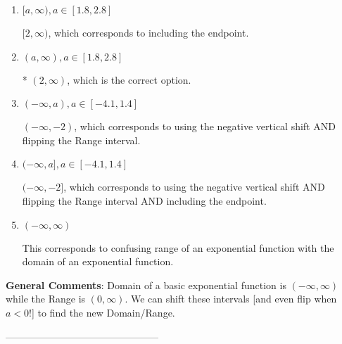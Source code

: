 \documentclass{article}[14pt]
\begin{document}
\begin{enumerate}[label=\Alph*.] 
\item $ [a, \infty), a \in [1.8, 2.8] $ 

 $[2, \infty)$, which corresponds to including the endpoint. 
\item $ (a, \infty), a \in [1.8, 2.8] $ 

 * $(2, \infty)$, which is the correct option. 
\item $ (-\infty, a), a \in [-4.1, 1.4] $ 

 $(-\infty, -2)$, which corresponds to using the negative vertical shift AND flipping the Range interval. 
\item $ (-\infty, a], a \in [-4.1, 1.4] $ 

 $(-\infty, -2]$, which corresponds to using the negative vertical shift AND flipping the Range interval AND including the endpoint. 
\item $ (-\infty, \infty) $ 

 This corresponds to confusing range of an exponential function with the domain of an exponential function. 
\end{enumerate} 
 
\textbf{General Comments}: Domain of a basic exponential function is $(-\infty, \infty)$ while the Range is $(0, \infty)$. We can shift these intervals [and even flip when $a<0$!] to find the new Domain/Range.

-----------------------------------------------
\end{document}
